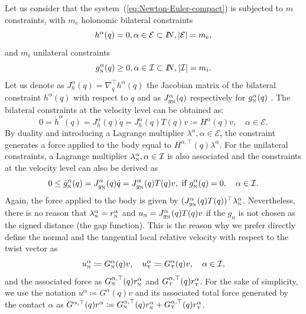 Let us consider that the system~(\ref{eq:Newton-Euler-compact}) is  subjected to $m$ constraints, with $m_{e}$ holonomic bilateral
constraints
\begin{equation}
  \label{eq:bilateral-constraints}
  h^\alpha(q)=0, \alpha \in \mathcal{E}\subset\mbox{\rm $I\!\!N$},  |\mathcal E| = m_e,
\end{equation}
and  $m_{i}$ unilateral constraints
\begin{equation}
  \label{eq:unilateral-constraints}
  g_{{\hbox{\tiny{N}}}}^\alpha(q)\geq 0, \alpha \in \mathcal{I}\subset\mbox{\rm $I\!\!N$},  |\mathcal I| = m_i.
\end{equation}
%
Let us denote as $J^\alpha_h(q) = \nabla^\top_q h^\alpha(q)  $ the Jacobian matrix of the bilateral constraint $h^\alpha(q)$ with respect to $q$ and as $J^\alpha_{g_{\hbox{\tiny{N}}}}(q)$ respectively for $g_{{\hbox{\tiny{N}}}}^\alpha(q)$  .
%
The bilateral constraints at the velocity level can be obtained as:
\begin{equation}
  \label{eq:bilateral-constraints-velocity}
 0 = \dot h^\alpha(q)= J^\alpha_h(q)\dot q = J^\alpha_h(q) T(q) v \coloneqq H^\alpha(q)  v,\quad  \alpha \in \mathcal{E}.
\end{equation}
By duality and introducing a Lagrange multiplier $\lambda^\alpha, \alpha \in \mathcal E$, the constraint generates a force applied to the body equal to $H^{\alpha,\top}(q)\lambda^\alpha$. For the unilateral constraints, a Lagrange multiplier $\lambda_{{\hbox{\tiny{N}}}}^\alpha, \alpha \in \mathcal I$ is also associated and the constraints at the velocity level can also be derived as
\begin{equation}
  \label{eq:unilateral-constraints-velocity}
 0 \leq  \dot g_{\hbox{\tiny{N}}}^\alpha(q)= J^\alpha_{g_{\hbox{\tiny{N}}}}(q) \dot q = J^\alpha_{g_{\hbox{\tiny{N}}}}(q)  T(q) v , \text{ if } g_{{\hbox{\tiny{N}}}}^\alpha(q) = 0,\quad  \alpha \in \mathcal{I}.
\end{equation}
Again, the force applied to the body is given by $(J^\alpha_{g_{\hbox{\tiny{N}}}}(q) T(q))^\top\lambda^\alpha_{\hbox{\tiny{N}}}$. {Nevertheless, there is no reason that $\lambda^\alpha_{\hbox{\tiny{N}}} =r^\alpha_{\hbox{\tiny{N}}}$ and $u_{\hbox{\tiny{N}}} = J^\alpha_{g_{\hbox{\tiny{N}}}}(q) T(q) v$ if the $g_n$ is not chosen as the signed distance (the gap function)}. This is the reason why  we prefer  directly define the normal and the tangential local relative velocity with respect to the {twist vector} as
\begin{equation}
  \label{eq:unilateral-constraints-velocity-kinematic1}
   u^\alpha_{\hbox{\tiny{N}}}  \coloneqq G_{\hbox{\tiny{N}}}^\alpha(q) v, \quad u^\alpha_{\hbox{\tiny{T}}}  \coloneqq G_{\hbox{\tiny{T}}}^\alpha(q) v, \quad \alpha \in \mathcal{I},
\end{equation}
and the associated force as $G_{\hbox{\tiny{N}}}^{\alpha,\top}(q) r^{\alpha}_{\hbox{\tiny{N}}} $ and $G_{\hbox{\tiny{T}}}^{\alpha,\top}(q) r^{\alpha}_{\hbox{\tiny{T}}}$. For the sake of simplicity, we use the notation $u^\alpha  \coloneqq G^\alpha(q) v$ and its associated total force generated by the contact $\alpha$ as $G^{\alpha,\top}(q) r^{\alpha} \coloneqq G_{\hbox{\tiny{N}}}^{\alpha,\top}(q) r^{\alpha}_{\hbox{\tiny{N}}} + G_{\hbox{\tiny{T}}}^{\alpha,\top}(q) r^{\alpha}_{\hbox{\tiny{T}}} $.

